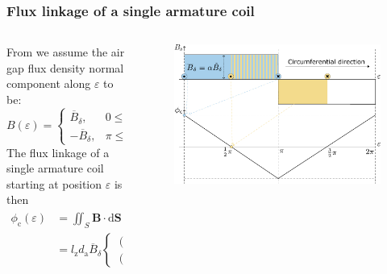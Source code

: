 \begin{frame}
	\frametitle{Flux linkage of a single armature coil}
	\begin{columns}
		\begin{column}{0.45\textwidth}
			From   we assume the air gap flux density normal component along $\varepsilon$ to be:
			\begin{equation}
				B(\varepsilon) = \begin{cases}
					\overline{B}_\delta, &  0 \leq \varepsilon < \pi,\\
					-\overline{B}_\delta, &  \pi \leq \varepsilon < 2\pi.
				\end{cases}
				\label{eq:Air_gap_flux_density_DC_machine_circumference}
			\end{equation}
			The flux linkage of a single armature coil starting at position $\varepsilon$ is then
			\begin{equation*}
				\begin{split}
				\phi_\mathrm{c}(\varepsilon) &= \iint_{S} \bm{B} \cdot \mathrm{d}\bm{S}
											 = l_\mathrm{z}d_\mathrm{a}\int_{\varepsilon}^{\varepsilon+\pi}B(\varepsilon) \mathrm{d}\varepsilon \\
											 & = l_\mathrm{z}d_\mathrm{a}\overline{B}_\delta\begin{cases}
												(\pi/2 - \varepsilon), &  0 \leq \varepsilon < \pi,\\
												(\varepsilon - 3\pi/2), &  \pi \leq \varepsilon < 2\pi.
											\end{cases}
				\end{split}
				\label{eq:Flux_linkage_single_coil}
			\end{equation*}
		\end{column}
	\hfill
	\begin{column}{0.50\textwidth}
		\begin{figure}
			\centering
			\includegraphics[height=0.55\textheight]{fig/lec03/Flux_density_and_linkage.pdf}

\end{figure}
\end{column}
\end{columns}
\end{frame}
